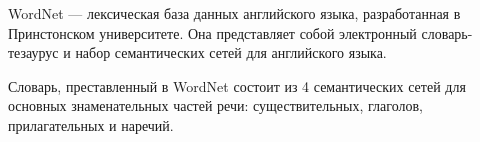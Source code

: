 
WordNet \cite{Miller95wordnet:a} --- лексическая база данных английского языка, разработанная в Принстонском университете. 
Она представляет собой электронный словарь-тезаурус и набор семантических сетей для английского языка. 

Словарь, преставленный в WordNet состоит из 4 семантических сетей для основных знаменательных частей речи: 
существительных, глаголов, прилагательных и наречий.